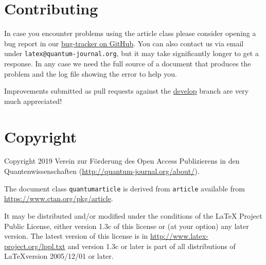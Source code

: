 \documentclass[a4paper,noarxiv,onecolumn]{quantumarticle}
\begin{document}
	\section{Contributing}
	In case you encounter problems using the article class please consider opening a bug report in our \href{https://github.com/quantum-journal/quantum-journal/issues}{bug-tracker on GitHub}. You can also contact us via email under \texttt{latex@quantum-journal.org}, but it may take significantly longer to get a response. In any case we need the full source of a document that produces the problem and the log file showing the error to help you.
	
	Improvements submitted as pull requests against the \href{https://github.com/quantum-journal/quantum-journal/tree/develop}{develop} branch are very much appreciated!
	
	\section{Copyright}
	Copyright 2019 Verein zur Förderung des Open Access Publizierens in den Quantenwissenschaften (\url{http://quantum-journal.org/about/}).
	
	The document class \texttt{quantumarticle} is derived from \texttt{article} available from \url{https://www.ctan.org/pkg/article}.
	
	It may be distributed and/or modified under the conditions of the LaTeX Project Public License, either version 1.3c of this license or (at your option) any later version. The latest version of this license is in \url{http://www.latex-project.org/lppl.txt} and version 1.3c or later is part of all distributions of \LaTeX version 2005/12/01 or later.
\end{document}
